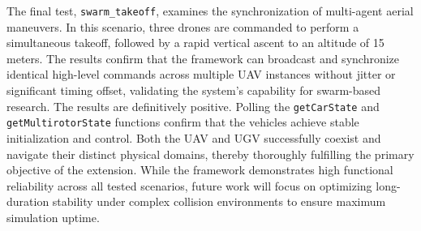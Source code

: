 The final test, \texttt{swarm\_takeoff}, examines the synchronization of multi-agent aerial maneuvers. In this scenario, three drones are commanded to perform a simultaneous takeoff, followed by a rapid vertical ascent to an altitude of 15 meters. The results confirm that the framework can broadcast and synchronize identical high-level commands across multiple UAV instances without jitter or significant timing offset, validating the system's capability for swarm-based research.\newline\newline
The results are definitively positive. Polling the \texttt{getCarState} and \texttt{getMultirotorState} functions confirm that the vehicles achieve stable initialization and control. Both the UAV and UGV successfully coexist and navigate their distinct physical domains, thereby thoroughly fulfilling the primary objective of the extension. While the framework demonstrates high functional reliability across all tested scenarios, future work will focus on optimizing long-duration stability under complex collision environments to ensure maximum simulation uptime.